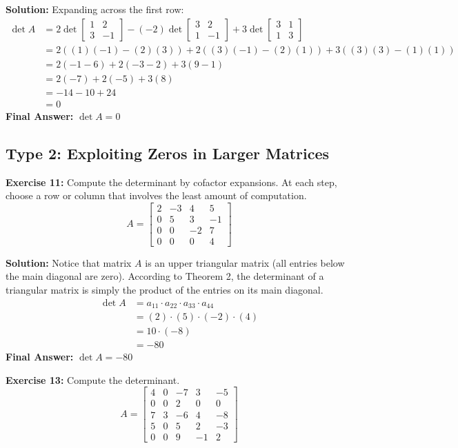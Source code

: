 \documentclass{article}
\begin{document}
\textbf{Solution:}
Expanding across the first row:
\begin{align*}
\det A &= 2 \det \begin{bmatrix} 1 & 2 \\ 3 & -1 \end{bmatrix} - (-2) \det \begin{bmatrix} 3 & 2 \\ 1 & -1 \end{bmatrix} + 3 \det \begin{bmatrix} 3 & 1 \\ 1 & 3 \end{bmatrix} \\
&= 2((1)(-1) - (2)(3)) + 2((3)(-1) - (2)(1)) + 3((3)(3) - (1)(1)) \\
&= 2(-1 - 6) + 2(-3 - 2) + 3(9 - 1) \\
&= 2(-7) + 2(-5) + 3(8) \\
&= -14 - 10 + 24 \\
&= 0
\end{align*}
\textbf{Final Answer:} $\det A = 0$

\subsection{Type 2: Exploiting Zeros in Larger Matrices}

\textbf{Exercise 11:} Compute the determinant by cofactor expansions. At each step, choose a row or column that involves the least amount of computation.
\[ A = \begin{bmatrix} 2 & -3 & 4 & 5 \\ 0 & 5 & 3 & -1 \\ 0 & 0 & -2 & 7 \\ 0 & 0 & 0 & 4 \end{bmatrix} \]

\textbf{Solution:}
Notice that matrix $A$ is an upper triangular matrix (all entries below the main diagonal are zero). According to Theorem 2, the determinant of a triangular matrix is simply the product of the entries on its main diagonal.
\begin{align*}
\det A &= a_{11} \cdot a_{22} \cdot a_{33} \cdot a_{44} \\
&= (2) \cdot (5) \cdot (-2) \cdot (4) \\
&= 10 \cdot (-8) \\
&= -80
\end{align*}
\textbf{Final Answer:} $\det A = -80$

\vspace{0.5cm}
\textbf{Exercise 13:} Compute the determinant.
\[ A = \begin{bmatrix} 4 & 0 & -7 & 3 & -5 \\ 0 & 0 & 2 & 0 & 0 \\ 7 & 3 & -6 & 4 & -8 \\ 5 & 0 & 5 & 2 & -3 \\ 0 & 0 & 9 & -1 & 2 \end{bmatrix} \]
\end{document}
